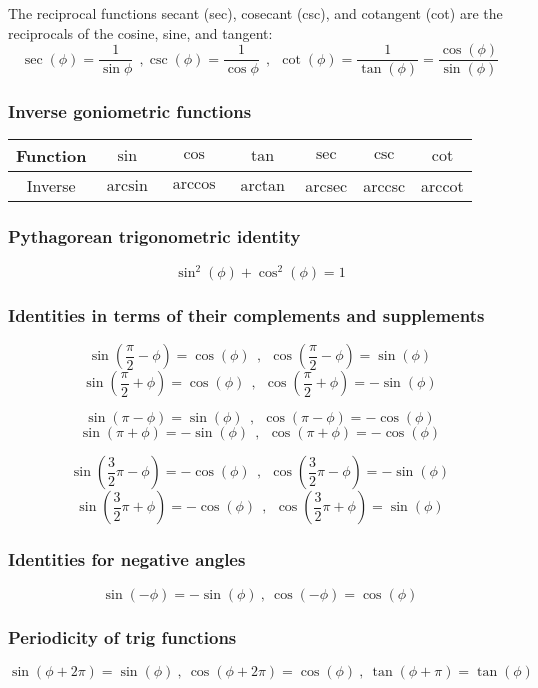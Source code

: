 The reciprocal functions secant (sec), cosecant (csc), and cotangent (cot) are the reciprocals of the cosine, sine, and tangent:
\[
\sec(\phi)=\frac{1}{\sin{\phi}}~~,\csc(\phi)=\frac{1}{\cos{\phi}}~~,~~\cot(\phi)=\frac{1}{\tan(\phi)}=\frac{\cos(\phi)}{\sin(\phi)}
\]

\subsubsection{Inverse goniometric functions}
\begin{tabular}{  | c || c | c | c | c | c | c | }
	\hline
	Function   &  $\sin$  &  $\cos$  &  $\tan$  &  $\sec$ &  $\csc$ &  $\cot$ \\
	\hline
	Inverse   &  $\arcsin$  &  $\arccos$  &  $\arctan$  &  arcsec  &  arccsc  &  arccot \\
	\hline	
\end{tabular}


\subsubsection{Pythagorean trigonometric identity}
\[
\sin^2(\phi)+\cos^2(\phi)=1 
\]


\subsubsection{Identities in terms of their complements and supplements}
\[
\sin\left(\frac{\pi}{2}-\phi\right)=\cos(\phi) \ \ , \ \ \cos\left(\frac{\pi}{2}-\phi\right)=\sin(\phi)
\]
\[
\sin\left(\frac{\pi}{2}+\phi\right)=\cos(\phi) \ \ , \ \ \cos\left(\frac{\pi}{2}+\phi\right)=-\sin(\phi)
\]

\[
\sin(\pi-\phi)=\sin(\phi) \ \ , \ \ \cos(\pi-\phi)=-\cos(\phi)
\]
\[
\sin(\pi+\phi)=-\sin(\phi) \ \ , \ \ \cos(\pi+\phi)=-\cos(\phi)
\]

\[
\sin\left(\frac{3}{2}\pi-\phi\right)=-\cos(\phi) \ \ , \ \ \cos\left(\frac{3}{2}\pi-\phi\right)=-\sin(\phi)
\]
\[
\sin\left(\frac{3}{2}\pi+\phi\right)=-\cos(\phi) \ \ , \ \ \cos\left(\frac{3}{2}\pi+\phi\right)=\sin(\phi)
\]


\subsubsection{Identities for negative angles}
\[
\sin(-\phi) = -\sin(\phi) \ , \ \cos(-\phi) = \cos(\phi)
\]


\subsubsection{Periodicity of trig functions}
\[
\sin(\phi+2\pi)=\sin(\phi) \ , \ \cos(\phi+2\pi)=\cos(\phi) \ , \ \tan(\phi+\pi)=\tan(\phi)
\]


